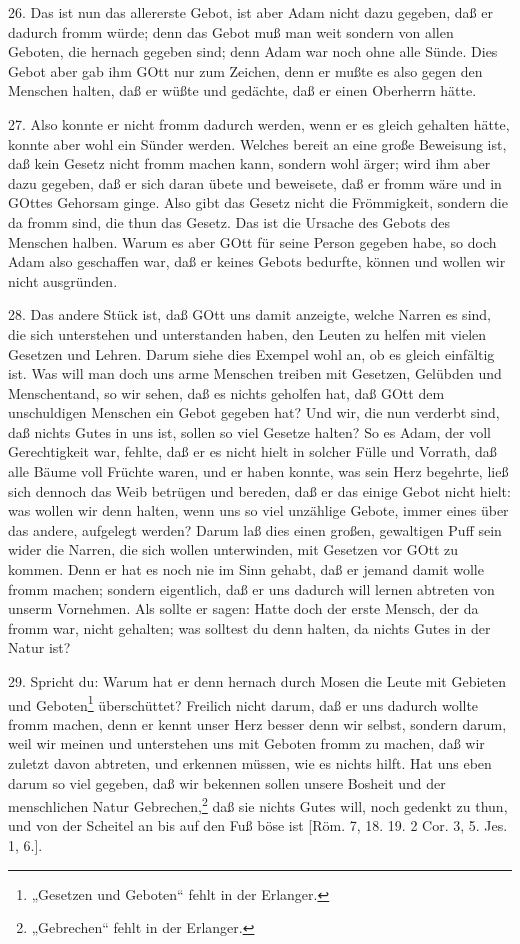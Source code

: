 26. Das ist nun das allererste Gebot, ist aber Adam nicht dazu gegeben, daß er dadurch fromm würde; denn das Gebot muß man weit sondern von allen Geboten, die hernach gegeben sind; denn Adam war noch ohne alle Sünde. Dies Gebot aber gab ihm GOtt nur zum Zeichen, denn er mußte es also gegen den Menschen halten, daß er wüßte und gedächte, daß er einen Oberherrn hätte.

27. Also konnte er nicht fromm dadurch werden, wenn er es gleich gehalten hätte, konnte aber wohl ein Sünder werden. Welches bereit an eine große Beweisung ist, daß kein Gesetz nicht fromm machen kann, sondern wohl ärger; wird ihm aber dazu gegeben, daß er sich daran übete und beweisete, daß er fromm wäre und in GOttes Gehorsam ginge. Also gibt das Gesetz nicht die Frömmigkeit, sondern die da fromm sind, die thun das Gesetz. Das ist die Ursache des Gebots des Menschen halben. Warum es aber GOtt für seine Person gegeben habe, so doch Adam also geschaffen war, daß er keines Gebots bedurfte, können und wollen wir nicht ausgründen.

28. Das andere Stück ist, daß GOtt uns damit anzeigte, welche Narren es sind, die sich unterstehen und unterstanden haben, den Leuten zu helfen mit vielen Gesetzen und Lehren. Darum siehe dies Exempel wohl an, ob es gleich einfältig ist. Was will man doch uns arme Menschen treiben mit Gesetzen, Gelübden und Menschentand, so wir sehen, daß es nichts geholfen hat, daß GOtt dem unschuldigen Menschen ein Gebot gegeben hat? Und wir, die nun verderbt sind, daß nichts Gutes in uns ist, sollen so viel Gesetze halten? So es Adam, der voll Gerechtigkeit war, fehlte, daß er es nicht hielt in solcher Fülle und Vorrath, daß alle Bäume voll Früchte waren, und er haben konnte, was sein Herz begehrte, ließ sich dennoch das Weib betrügen und bereden, daß er das einige Gebot nicht hielt: was wollen wir denn halten, wenn uns so viel unzählige Gebote, immer eines über das andere, aufgelegt werden? Darum laß dies einen großen, gewaltigen Puff sein wider die Narren, die sich wollen unterwinden, mit Gesetzen vor GOtt zu kommen. Denn er hat es noch nie im Sinn gehabt, daß er jemand damit wolle fromm machen; sondern eigentlich, daß er uns dadurch will lernen abtreten von unserm Vornehmen. Als sollte er sagen: Hatte doch der erste Mensch, der da fromm war, nicht gehalten; was solltest du denn halten, da nichts Gutes in der Natur ist?

29. Spricht du: Warum hat er denn hernach durch Mosen die Leute mit Gebieten und Geboten\footnote{„Gesetzen und Geboten“ fehlt in der Erlanger.} überschüttet? Freilich nicht darum, daß er uns dadurch wollte fromm machen, denn er kennt unser Herz besser denn wir selbst, sondern darum, weil wir meinen und unterstehen uns mit Geboten fromm zu machen, daß wir zuletzt davon abtreten, und erkennen müssen, wie es nichts hilft. Hat uns eben darum so viel gegeben, daß wir bekennen sollen unsere Bosheit und der menschlichen Natur Gebrechen,\footnote{„Gebrechen“ fehlt in der Erlanger.} daß sie nichts Gutes will, noch gedenkt zu thun, und von der Scheitel an bis auf den Fuß böse ist [Röm. 7, 18. 19. 2 Cor. 3, 5. Jes. 1, 6.].


